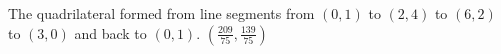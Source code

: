 {The quadrilateral formed from line segments from $(0,1)$ to $(2,4)$ to $(6,2)$ to $(3,0)$ and back to $(0,1)$.
}
{$\left(\frac{209}{75},\frac{139}{75}\right)$
}
